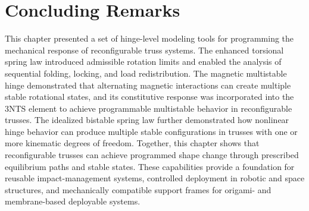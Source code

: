 \section{Concluding Remarks}\label{04-sec-conclusion}
This chapter presented a set of hinge-level modeling tools for programming the mechanical response of reconfigurable truss systems. The enhanced torsional spring law introduced admissible rotation limits and enabled the analysis of sequential folding, locking, and load redistribution. The magnetic multistable hinge demonstrated that alternating magnetic interactions can create multiple stable rotational states, and its constitutive response was incorporated into the 3NTS element to achieve programmable multistable behavior in reconfigurable trusses. The idealized bistable spring law further demonstrated how nonlinear hinge behavior can produce multiple stable configurations in trusses with one or more kinematic degrees of freedom. Together, this chapter shows that reconfigurable trusses can achieve programmed shape change through prescribed equilibrium paths and stable states. These capabilities provide a foundation for reusable impact-management systems, controlled deployment in robotic and space structures, and mechanically compatible support frames for origami- and membrane-based deployable systems.